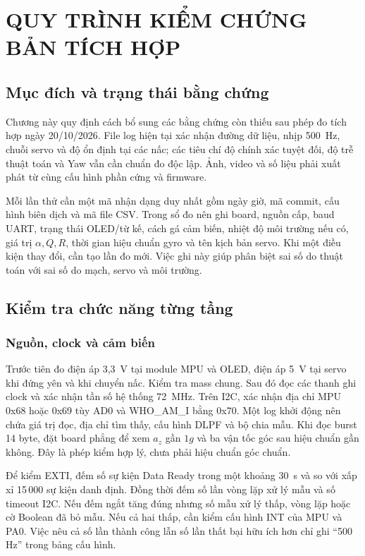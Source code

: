 \chapter{QUY TRÌNH KIỂM CHỨNG BẢN TÍCH HỢP}

\section{Mục đích và trạng thái bằng chứng}
Chương này quy định cách bổ sung các bằng chứng còn thiếu sau phép đo tích hợp ngày 20/10/2026. File log hiện tại xác nhận đường dữ liệu, nhịp 500~Hz, chuỗi servo và độ ổn định tại các nấc; các tiêu chí độ chính xác tuyệt đối, độ trễ thuật toán và Yaw vẫn cần chuẩn đo độc lập. Ảnh, video và số liệu phải xuất phát từ cùng cấu hình phần cứng và firmware.

Mỗi lần thử cần một mã nhận dạng duy nhất gồm ngày giờ, mã commit, cấu hình biên dịch và mã file CSV. Trong sổ đo nên ghi board, nguồn cấp, baud UART, trạng thái OLED/từ kế, cách gá cảm biến, nhiệt độ môi trường nếu có, giá trị $\alpha,Q,R$, thời gian hiệu chuẩn gyro và tên kịch bản servo. Khi một điều kiện thay đổi, cần tạo lần đo mới. Việc ghi này giúp phân biệt sai số do thuật toán với sai số do mạch, servo và môi trường.

\section{Kiểm tra chức năng từng tầng}
\subsection{Nguồn, clock và cảm biến}
Trước tiên đo điện áp 3,3~V tại module MPU và OLED, điện áp 5~V tại servo khi đứng yên và khi chuyển nấc. Kiểm tra mass chung. Sau đó đọc các thanh ghi clock và xác nhận tần số hệ thống 72~MHz. Trên I2C, xác nhận địa chỉ MPU 0x68 hoặc 0x69 tùy AD0 và WHO\_AM\_I bằng 0x70. Một log khởi động nên chứa giá trị đọc, địa chỉ tìm thấy, cấu hình DLPF và bộ chia mẫu. Khi đọc burst 14 byte, đặt board phẳng để xem $a_z$ gần $1g$ và ba vận tốc góc sau hiệu chuẩn gần không. Đây là phép kiểm hợp lý, chưa phải hiệu chuẩn góc chuẩn.

Để kiểm EXTI, đếm số sự kiện Data Ready trong một khoảng 30~s và so với xấp xỉ 15\,000 sự kiện danh định. Đồng thời đếm số lần vòng lặp xử lý mẫu và số timeout I2C. Nếu đếm ngắt tăng đúng nhưng số mẫu xử lý thấp, vòng lặp hoặc cờ Boolean đã bỏ mẫu. Nếu cả hai thấp, cần kiểm cấu hình INT của MPU và PA0. Việc nêu cả số lần thành công lẫn số lần thất bại hữu ích hơn chỉ ghi ``500 Hz'' trong bảng cấu hình.

